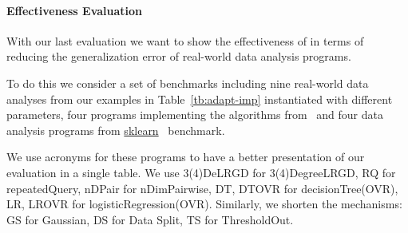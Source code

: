 \paragraph{Effectiveness Evaluation}

With our last evaluation we want to show the effectiveness of {\THESYSTEM} in terms of reducing the generalization error of real-world data analysis programs.

To do this we consider a set of benchmarks including 
nine real-world data analyses from our examples in Table~\ref{tb:adapt-imp} instantiated with different parameters,
four programs implementing the algorithms from~\cite{Jamieson2015TheAO}
and four data analysis programs 
from \hyperlink{https://github.com/scikit-learn/scikit-learn/tree/main/examples}{sklearn}~\cite{SklearnBenchmark} benchmark.

{We use acronyms for these programs to have a better presentation of our evaluation in a single table. We use
 3(4)DeLRGD for 3(4)DegreeLRGD, RQ for repeatedQuery, nDPair for nDimPairwise,
DT, DTOVR for decisionTree(OVR), LR, LROVR for logisticRegression(OVR). Similarly, we shorten the mechanisms: GS for Gaussian, DS for Data Split,
TS for ThresholdOut.  }

